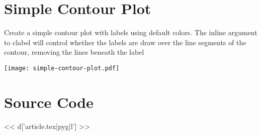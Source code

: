 \section{Simple Contour Plot}

Create a simple contour plot with labels using default colors.  The
inline argument to clabel will control whether the labels are draw
over the line segments of the contour, removing the lines beneath
the label

\texttt{[image: simple-contour-plot.pdf]}

\section{Source Code}

<< d['article.tex|pyg|l'] >>
